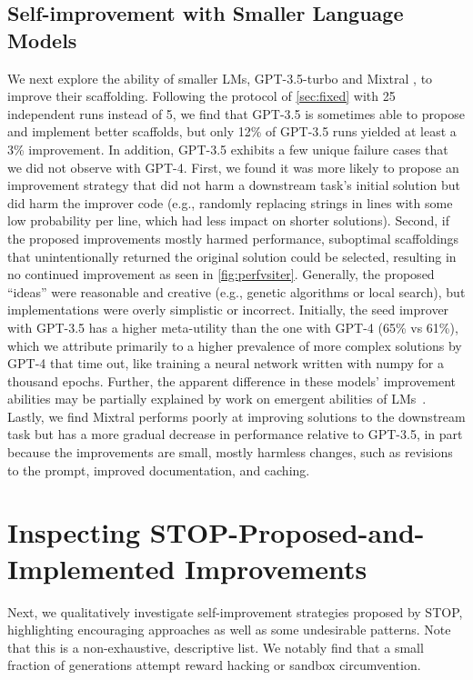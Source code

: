 \documentclass{article} %
\begin{document}
\subsection{Self-improvement with Smaller Language Models}\label{sec:small}
%
We next explore the ability of smaller LMs, GPT-3.5-turbo and Mixtral \citep{jiang2024mixtral}, to improve their scaffolding. Following the protocol of \cref{sec:fixed} with 25 independent runs instead of 5, we find that GPT-3.5 is sometimes able to propose and implement better scaffolds, but only 12\% of GPT-3.5 runs yielded at least a 3\% improvement. In addition, GPT-3.5 exhibits a few unique failure cases that we did not observe with GPT-4. First, we found it was more likely to propose an improvement strategy that did not harm a downstream task's initial solution but did harm the improver code (e.g., randomly replacing strings in lines with some low probability per line, which had less impact on shorter solutions). Second, if the proposed improvements mostly harmed performance, suboptimal scaffoldings that unintentionally returned the original solution could be selected, resulting in no continued improvement as seen in \cref{fig:perfvsiter}. Generally, the proposed ``ideas'' were reasonable and creative (e.g., genetic algorithms or local search), but implementations were overly simplistic or incorrect.
Initially, the seed improver with GPT-3.5 has a higher meta-utility than the one with GPT-4 (65\% vs 61\%), which we attribute primarily to a higher prevalence of more complex solutions by GPT-4 that time out, like training a neural network written with numpy for a thousand epochs. Further, the apparent difference in these models' improvement abilities may be partially explained by work on emergent abilities of LMs~\citep{wei_emergent_2022,ganguli2022predictability,schaeffer2023are}. Lastly, we find Mixtral performs poorly at improving solutions to the downstream task but has a more gradual decrease in performance relative to GPT-3.5, in part because the improvements are small, mostly harmless changes, such as revisions to the prompt, improved documentation, and caching. \vspace{-2px}



%
\section{Inspecting STOP-Proposed-and-Implemented Improvements}
\vspace{-2px}
Next, we qualitatively investigate self-improvement strategies proposed by STOP, highlighting encouraging approaches as well as some undesirable patterns. Note that this is a non-exhaustive, descriptive list. We notably find that a small fraction of generations attempt reward hacking or sandbox circumvention.\vspace{-2px}
\end{document}
